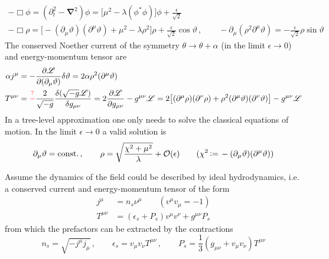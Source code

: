 \begin{subequations}
    \begin{gather}
        -\Box\phi=(\partial_t^2-\mathbf{\nabla}^2)\phi=\big[\mu^2-\lambda(\phi^*\phi)\big]\phi+\frac{\epsilon}{\sqrt{2}}\\
        -\Box\rho                                                =\big[-(\partial_\mu\vartheta)(\partial^\mu\vartheta)+\mu^2-\lambda\rho^2\big]\rho+\frac{\epsilon}{\sqrt{2}}\cos\vartheta\,,\qquad-\partial_\mu(\rho^2\partial^\mu\vartheta) =-\frac{\epsilon}{\sqrt{2}}\rho\sin\vartheta
    \end{gather}
\end{subequations}
The conserved Noether current of the symmetry $\theta\to\theta+\alpha$ (in the limit $\epsilon\to 0$) and energy-momentum tensor are
\begin{subequations}
    \begin{align}
        \alpha j^\mu & =-\frac{\partial\mathscr{L}}{\partial(\partial_\mu\vartheta)}\delta\vartheta=2\alpha\rho^2(\partial^\mu\vartheta)                                                                                                                                                                                           \\
        T^{\mu\nu}   & =\textcolor{red}{\overset{?}{-}}\frac{2}{\sqrt{-g}}\frac{\delta(\sqrt{-g}\mathscr{L})}{\delta g_{\mu\nu}}=2\frac{\partial\mathscr{L}}{\partial g_{\mu\nu}}-g^{\mu\nu}\mathscr{L}=2\big[(\partial^\mu\rho)(\partial^\nu\rho)+\rho^2(\partial^\mu\vartheta)(\partial^\nu\vartheta)\big]-g^{\mu\nu}\mathscr{L}
    \end{align}
\end{subequations}
In a tree-level approximation one only needs to solve the classical equations of motion. In the limit $\epsilon\to 0$ a valid solution is
\begin{equation}
    \partial_\mu\vartheta={\text{const.}}\,,\qquad\rho=\sqrt{\frac{\chi^2+\mu^2}{\lambda}}+\mathcal{O}(\epsilon)\qquad(\chi^2{\,\vcentcolon=\,}-(\partial_\mu\vartheta)(\partial^\mu\vartheta))
\end{equation}

Assume the dynamics of the field could be described by ideal hydrodynamics, i.e. a conserved current and energy-momentum tensor of the form 
\begin{subequations}
    \begin{align}
        j^\mu      & =n_s\nu^\mu\qquad(v^\mu v_\mu=-1)          \\
        T^{\mu\nu} & =(\epsilon_s+P_s)v^\mu v^\nu+g^{\mu\nu}P_s
    \end{align}
\end{subequations}
from which the prefactors can be extracted by the contractions
\begin{equation}
    n_s=\sqrt{-j^\mu j_\mu}\,,\qquad\epsilon_s=v_\mu v_\nu T^{\mu\nu}\,,\qquad P_s=\frac{1}{3}(g_{\mu\nu}+v_\mu v_\nu)T^{\mu\nu}
\end{equation}

